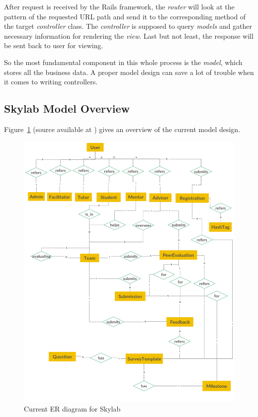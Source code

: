 After request is received by the Rails framework, the \textit{router} will look at the pattern of the requested URL path and send it to the corresponding method of the target \textit{controller} class. The \textit{controller} is supposed to query \textit{models} and gather necessary information for rendering the \textit{view}. Last but not least, the response will be sent back to user for viewing.

So the most fundamental component in this whole process is the \textit{model}, which stores all the business data. A proper model design can save a lot of trouble when it comes to writing controllers.

\subsection{Skylab Model Overview}

Figure~\ref{fig:SkylabER} (source available at \cite{citationERSource}) gives an overview of the current model design.

\begin{figure}[h]
  \centering
  \includegraphics[width=\textwidth]{Images/Skylab_ER.png}
  \caption{Current ER diagram for Skylab}
  \label{fig:SkylabER}
\end{figure}

